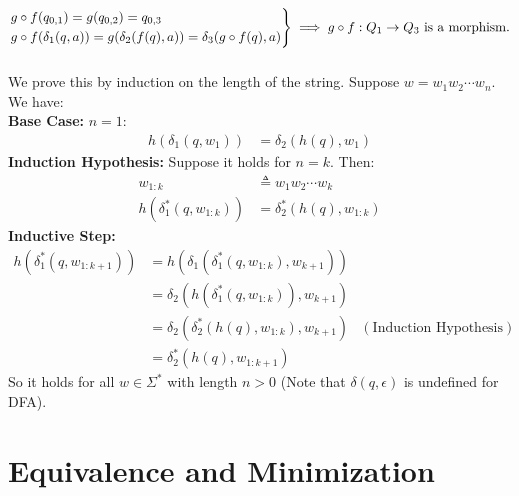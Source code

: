 \documentclass{article}
\numberwithin{equation}{subsection}
\begin{document}
\subsubsection{}
\begin{align}
\begin{rcases*}
g\circ f (q_{0,1}) = g (q_{0,2}) = q_{0,3} \\
g\circ f(\delta_1 (q, a)) = g(\delta_2(f(q), a)) = \delta_3(g\circ f(q), a)
\end{rcases*} \implies g\circ f: Q_1\to Q_3 \text{ is a morphism.}
\end{align}

\subsubsection{}
We prove this by induction on the length of the string.
Suppose \(w=w_1w_2\cdots w_n\).
We have:\\
\textbf{Base Case:} \(n=1\):\\
\begin{align}
h(\delta_1(q, w_1)) &= \delta_2(h(q), w_1)
\end{align}
\textbf{Induction Hypothesis:} Suppose it holds for \(n=k\). Then:
\begin{align}
w_{1:k} &\triangleq w_1w_2\cdots w_k\\
h(\delta_1^*(q, w_{1:k})) &= \delta_2^*(h(q), w_{1:k})
\end{align}
\textbf{Inductive Step:}
\begin{align}
h(\delta_1^*(q, w_{1:k+1})) &= h(\delta_1(\delta_1^*(q, w_{1:k}), w_{k+1}))\\
&= \delta_2(h(\delta_1^*(q, w_{1:k})), w_{k+1})\\
&= \delta_2(\delta_2^*(h(q), w_{1:k}), w_{k+1}) & (\text{Induction Hypothesis})\\
&= \delta_2^*(h(q), w_{1:k+1})
\end{align}
So it holds for all \(w \in \Sigma^*\) with length \(n>0\)
(Note that \(\delta(q, \epsilon)\) is undefined for DFA).

\section{Equivalence and Minimization}
\end{document}
